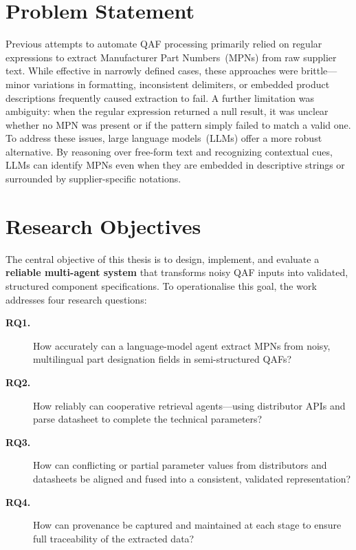 \section{Problem Statement }
Previous attempts to automate QAF processing primarily relied on regular expressions to extract Manufacturer Part Numbers~(MPNs) from raw supplier text.  
While effective in narrowly defined cases, these approaches were brittle---minor variations in formatting, inconsistent delimiters, or embedded product descriptions frequently caused extraction to fail.  
A further limitation was ambiguity: when the regular expression returned a null result, it was unclear whether no MPN was present or if the pattern simply failed to match a valid one.  
To address these issues, large language models~(LLMs) offer a more robust alternative.  
By reasoning over free-form text and recognizing contextual cues, LLMs can identify MPNs even when they are embedded in descriptive strings or surrounded by supplier-specific notations.

\section{Research Objectives }
The central objective of this thesis is to design, implement, and evaluate a \textbf{reliable multi-agent system} that transforms noisy QAF inputs into validated, structured component specifications.  
To operationalise this goal, the work addresses four research questions:

\begin{description}
\item[\textbf{RQ1.}] How accurately can a language-model agent extract MPNs from noisy, multilingual part designation fields in semi-structured QAFs?

\item[\textbf{RQ2.}] How reliably can cooperative retrieval agents—using distributor APIs and parse datasheet to complete the technical parameters? 

\item[\textbf{RQ3.}] How can conflicting or partial parameter values from distributors and datasheets be aligned and fused into a consistent, validated representation?

\item[\textbf{RQ4.}] How can provenance be captured and maintained at each stage to ensure full traceability of the extracted data?
\end{description}

